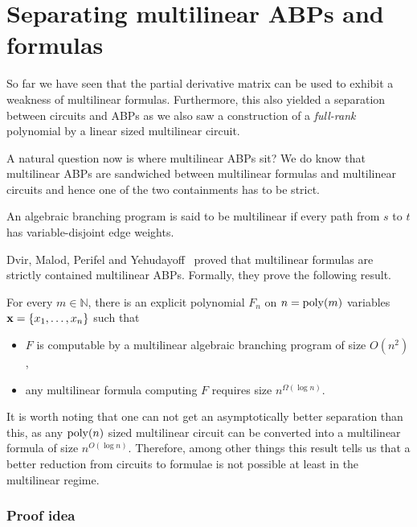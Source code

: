\chapter{Separating multilinear ABPs and formulas}\label{chap:DMPY}

So far we have seen that the partial derivative matrix can be used to exhibit a weakness of multilinear formulas. Furthermore, this also yielded a separation between circuits and ABPs as we also saw a construction of a \emph{full-rank}  polynomial by a linear sized multilinear circuit.

A natural question now is where multilinear ABPs sit? We do know that multilinear ABPs are sandwiched between multilinear formulas and multilinear circuits and hence one of the two containments has to be strict.

\begin{definition}
An algebraic branching program is said to be multilinear if every path from $s$ to $t$ has variable-disjoint edge weights. 
\end{definition}

Dvir, Malod, Perifel and Yehudayoff~\cite{dmpy12} proved that multilinear formulas are strictly contained multilinear ABPs. Formally, they prove the following result.

\begin{theorem}
\label{thm:separation}
For every $m \in \mathbb{N}$, there is an explicit polynomial $F_n$ on $n = \operatorname{poly}(m)$ variables $\mathbf{x} = \left\{x_1,\ldots,x_n\right\}$ such that
\begin{itemize}
\item $F$ is computable by a multilinear algebraic branching program of size $O(n^2)$,
\item any multilinear formula computing $F$ requires size $n^{\Omega(\log n)}$.
\end{itemize}
\end{theorem}

It is worth noting that one can not get an asymptotically better separation than this, as any $\operatorname{poly}(n)$ sized multilinear circuit can be converted into a multilinear formula of size $n^{O(\log n)}$.
Therefore, among other things this result tells us that a better reduction from circuits to formulae is not possible at least in the multilinear regime.

\subsection*{Proof idea}

